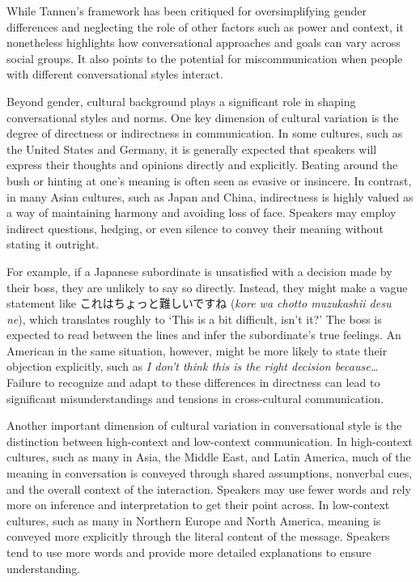 While Tannen's framework has been critiqued for oversimplifying gender differences and neglecting the role of other factors such as power and context, it nonetheless highlights how conversational approaches and goals can vary across social groups. It also points to the potential for miscommunication when people with different conversational styles interact. 

Beyond gender, cultural background plays a significant role in shaping conversational styles and norms. One key dimension of cultural variation is the degree of directness or indirectness in communication. In some cultures, such as the United States and Germany, it is generally expected that speakers will express their thoughts and opinions directly and explicitly. Beating around the bush or hinting at one's meaning is often seen as evasive or insincere. In contrast, in many Asian cultures, such as Japan and China, indirectness is highly valued as a way of maintaining harmony and avoiding loss of face. Speakers may employ indirect questions, hedging, or even silence to convey their meaning without stating it outright.

For example, if a Japanese subordinate is unsatisfied with a decision made by their boss, they are unlikely to say so directly. Instead, they might make a vague statement like これはちょっと難しいですね (\textit{kore wa chotto muzukashii desu ne}), which translates roughly to `This is a bit difficult, isn't it?' The boss is expected to read between the lines and infer the subordinate's true feelings. An American in the same situation, however, might be more likely to state their objection explicitly, such as \textit{I don't think this is the right decision because\dots} Failure to recognize and adapt to these differences in directness can lead to significant misunderstandings and tensions in cross-cultural communication.

Another important dimension of cultural variation in conversational style is the distinction between high-context and low-context communication. In high-context cultures, such as many in Asia, the Middle East, and Latin America, much of the meaning in conversation is conveyed through shared assumptions, nonverbal cues, and the overall context of the interaction. Speakers may use fewer words and rely more on inference and interpretation to get their point across. In low-context cultures, such as many in Northern Europe and North America, meaning is conveyed more explicitly through the literal content of the message. Speakers tend to use more words and provide more detailed explanations to ensure understanding.

